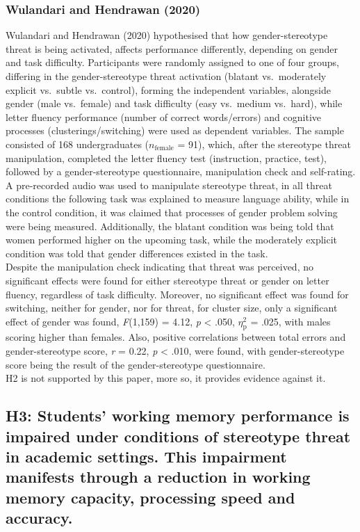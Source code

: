 \documentclass[
  stu,floatsintext]{apa7}
\begin{document}
\subsubsection{Wulandari and Hendrawan (2020)}\label{wulandaritrustyourabilities2020}

Wulandari and Hendrawan (2020) hypothesised that how gender-stereotype threat is being activated, affects performance differently, depending on gender and task difficulty.
Participants were randomly assigned to one of four groups, differing in the gender-stereotype threat activation (blatant vs.~moderately explicit vs.~subtle vs.~control), forming the independent variables, alongside gender (male vs.~female) and task difficulty (easy vs.~medium vs.~hard), while letter fluency performance (number of correct words/errors) and cognitive processes (clusterings/switching) were used as dependent variables.
The sample consisted of 168 undergraduates (\(n_{\text{female}}\) = 91), which, after the stereotype threat manipulation, completed the letter fluency test (instruction, practice, test), followed by a gender-stereotype questionnaire, manipulation check and self-rating.
A pre-recorded audio was used to manipulate stereotype threat, in all threat conditions the following task was explained to measure language ability, while in the control condition, it was claimed that processes of gender problem solving were being measured.
Additionally, the blatant condition was being told that women performed higher on the upcoming task, while the moderately explicit condition was told that gender differences existed in the task.\\
Despite the manipulation check indicating that threat was perceived, no significant effects were found for either stereotype threat or gender on letter fluency, regardless of task difficulty.
Moreover, no significant effect was found for switching, neither for gender, nor for threat, for cluster size, only a significant effect of gender was found, \emph{F}(1,159) = 4.12, \emph{p} \textless{} .050, \(\eta^{2}_{\text{p}}\) = .025, with males scoring higher than females.
Also, positive correlations between total errors and gender-stereotype score, \emph{r} = 0.22, \emph{p} \textless{} .010, were found, with gender-stereotype score being the result of the gender-stereotype questionnaire.\\
H2 is not supported by this paper, more so, it provides evidence against it.

\subsection{H3: Students' working memory performance is impaired under conditions of stereotype threat in academic settings. This impairment manifests through a reduction in working memory capacity, processing speed and accuracy.}\label{h3-students-working-memory-performance-is-impaired-under-conditions-of-stereotype-threat-in-academic-settings.-this-impairment-manifests-through-a-reduction-in-working-memory-capacity-processing-speed-and-accuracy.}
\end{document}
